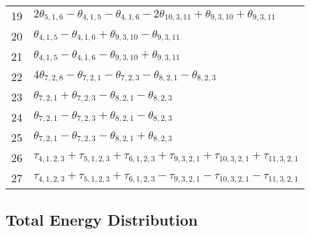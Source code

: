 \documentclass[10pt,oneside]{article}
\begin{document}
\begin{table}[h!]
\begin{tabular}{ll}
  19  & $2\theta_{5,1,6} - \theta_{4,1,5} - \theta_{4,1,6} - 2\theta_{10,3,11} + \theta_{9,3,10} + \theta_{9,3,11}$ \\
  20  & $\theta_{4,1,5} - \theta_{4,1,6} + \theta_{9,3,10} - \theta_{9,3,11}$ \\
  21  & $\theta_{4,1,5} - \theta_{4,1,6} - \theta_{9,3,10} + \theta_{9,3,11}$ \\
  22  & $4\theta_{7,2,8} - \theta_{7,2,1} - \theta_{7,2,3} - \theta_{8,2,1} - \theta_{8,2,3}$ \\
  23  & $\theta_{7,2,1} + \theta_{7,2,3} - \theta_{8,2,1} - \theta_{8,2,3}$ \\
  24  & $\theta_{7,2,1} - \theta_{7,2,3} + \theta_{8,2,1} - \theta_{8,2,3}$ \\
  25  & $\theta_{7,2,1} - \theta_{7,2,3} - \theta_{8,2,1} + \theta_{8,2,3}$ \\
  26  & $\tau_{4,1,2,3} + \tau_{5,1,2,3} + \tau_{6,1,2,3} + \tau_{9,3,2,1} + \tau_{10,3,2,1} + \tau_{11,3,2,1}$ \\
  27  & $\tau_{4,1,2,3} + \tau_{5,1,2,3} + \tau_{6,1,2,3} - \tau_{9,3,2,1} - \tau_{10,3,2,1} - \tau_{11,3,2,1}$ \\
\bottomrule
\end{tabular}
\end{table}

\begin{table}
\subsection*{Total Energy Distribution}
\centering\end{table}

\clearpage

\subsection{}
\end{document}
